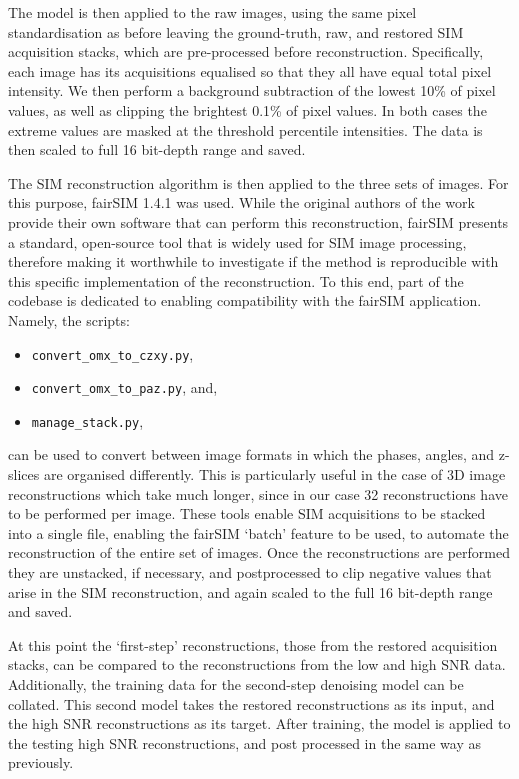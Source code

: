 \documentclass[12pt]{article}
\begin{document}
The model is then applied to the raw images, using the same pixel standardisation as before
leaving the ground-truth, raw, and restored SIM acquisition stacks,
which are pre-processed before reconstruction.
Specifically, each image has its acquisitions equalised so that they all have equal total pixel intensity.
We then perform a background subtraction of the lowest 10\% of pixel values, as well as clipping the brightest 0.1\% of pixel values.
In both cases the extreme values are masked at the threshold percentile intensities.
The data is then scaled to full 16 bit-depth range and saved.

The SIM reconstruction algorithm is then applied to the three sets of images.
For this purpose, fairSIM 1.4.1 \cite{fairSIM} was used.
While the original authors of the work provide their own software that can perform this reconstruction,
fairSIM presents a standard, open-source tool that is widely used for SIM image processing,
therefore making it worthwhile to investigate if the method is reproducible with this specific implementation of the reconstruction.
To this end, part of the codebase is dedicated to enabling compatibility with the fairSIM application.
Namely, the scripts:
\begin{itemize}
    \item \texttt{convert\_omx\_to\_czxy.py},
    \item \texttt{convert\_omx\_to\_paz.py}, and,
    \item \texttt{manage\_stack.py},
\end{itemize}
can be used to convert between image formats in which the phases, angles, and z-slices are organised differently.
This is particularly useful in the case of 3D image reconstructions which take much longer,
since in our case 32 reconstructions have to be performed per image.
These tools enable SIM acquisitions to be stacked into a single file,
enabling the fairSIM `batch' feature to be used,
to automate the reconstruction of the entire set of images.
Once the reconstructions are performed they are unstacked,
if necessary, and postprocessed to clip negative values that arise in the SIM reconstruction,
and again scaled to the full 16 bit-depth range and saved.

At this point the `first-step' reconstructions, those from the restored acquisition stacks,
can be compared to the reconstructions from the low and high SNR data.
Additionally, the training data for the second-step denoising model can be collated.
This second model takes the restored reconstructions as its input, and the high SNR reconstructions as its target.
After training, the model is applied to the testing high SNR reconstructions, and post processed in the same way as previously.
\end{document}
